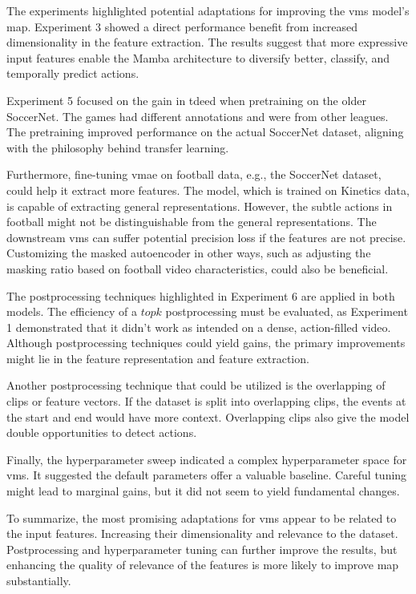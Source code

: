 The experiments highlighted potential adaptations for improving the \acrshort{vms} model's \acrshort{map}. Experiment 3 showed a direct performance benefit from increased dimensionality in the feature extraction. The results suggest that more expressive input features enable the Mamba architecture to diversify better, classify, and temporally predict actions. 

Experiment 5 focused on the gain in \acrshort{tdeed} when pretraining on the older SoccerNet. The games had different annotations and were from other leagues. The pretraining improved performance on the actual SoccerNet dataset, aligning with the philosophy behind transfer learning. 

Furthermore, fine-tuning \acrshort{vmae} on football data, e.g., the SoccerNet dataset, could help it extract more features. The model, which is trained on Kinetics data, is capable of extracting general representations. However, the subtle actions in football might not be distinguishable from the general representations. The downstream \acrshort{vms} can suffer potential precision loss if the features are not precise. Customizing the masked autoencoder in other ways, such as adjusting the masking ratio based on football video characteristics, could also be beneficial. 

The postprocessing techniques highlighted in Experiment 6 are applied in both models. The efficiency of a $topk$ postprocessing must be evaluated, as Experiment 1 demonstrated that it didn't work as intended on a dense, action-filled video. Although postprocessing techniques could yield gains, the primary improvements might lie in the feature representation and feature extraction. 

Another postprocessing technique that could be utilized is the overlapping of clips or feature vectors. If the dataset is split into overlapping clips, the events at the start and end would have more context. Overlapping clips also give the model double opportunities to detect actions.

Finally, the hyperparameter sweep indicated a complex hyperparameter space for \acrshort{vms}. It suggested the default parameters offer a valuable baseline. Careful tuning might lead to marginal gains, but it did not seem to yield fundamental changes. 

To summarize, the most promising adaptations for \acrshort{vms} appear to be related to the input features. Increasing their dimensionality and relevance to the dataset.  Postprocessing and hyperparameter tuning can further improve the results, but enhancing the quality of relevance of the features is more likely to improve \acrshort{map} substantially.



